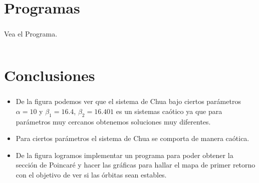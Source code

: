 \section{Programas}

\begin{frame}[fragile]
	\frametitle{\secname}
	\begin{minipage}{0.45\textwidth}
		Vea el Programa.
	\end{minipage}
	\begin{minipage}{0.45\textwidth}
		\inputminted[fontsize=\tiny, highlightlines={13-16,28-30,33-38}, firstline=1, lastline=41]{python}{poincare_chua.py}
	\end{minipage}
\end{frame}

\section{Conclusiones}

\begin{frame}
	\frametitle{\secname}
	\begin{itemize}
		\item De la figura podemos ver que el sistema de Chua bajo ciertos parámetros $\alpha= 10$  y $\beta_{1}=16.4$, $\beta_{2}=16.401$ es un sistemas caótico ya que para parámetros muy cercanos obtenemos soluciones muy diferentes.
		\item Para ciertos parámetros el sistema de Chua se comporta de manera caótica.
		\item De la figura logramos implementar un programa para poder obtener la sección de Poincaré y hacer las gráficas para hallar el mapa de primer retorno con el objetivo de ver si las órbitas sean estables. %
	\end{itemize}
\end{frame}
